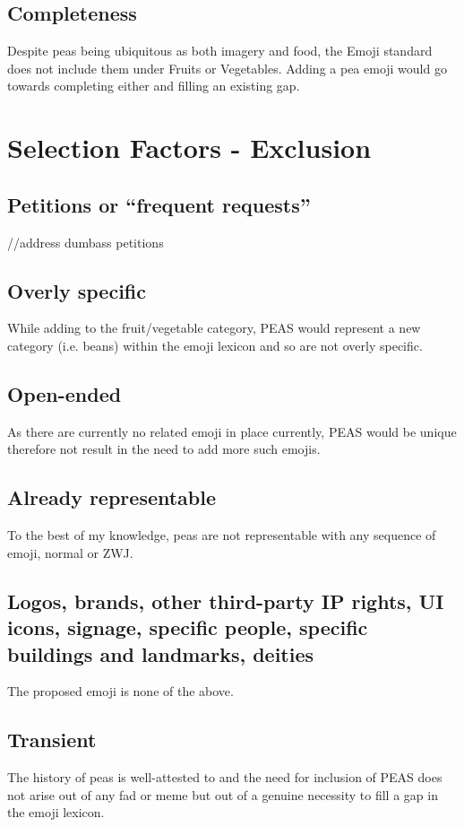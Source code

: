 \documentclass[oneside]{article}
\begin{document}
\subsection{Completeness}
Despite peas being ubiquitous as both imagery and food, the Emoji standard does
not include them under Fruits or Vegetables. Adding a pea emoji would go
towards completing either and filling an existing gap.

\section{Selection Factors - Exclusion}

\subsection{Petitions or “frequent requests”}
//address dumbass petitions

\subsection{Overly specific}
While adding to the fruit/vegetable category, PEAS would represent a new
category (i.e. beans) within the emoji lexicon and so are not overly specific.

\subsection{Open-ended}
As there are currently no related emoji in place currently, PEAS would be
unique therefore not result in the need to add more such emojis.

\subsection{Already representable}
To the best of my knowledge, peas are not representable with any sequence of
emoji, normal or ZWJ.

\subsection{Logos, brands, other third-party IP rights, UI icons, signage, specific people, specific buildings and landmarks, deities}
The proposed emoji is none of the above.

\subsection{Transient}
The history of peas is well-attested to and the need for inclusion of PEAS does
not arise out of any fad or meme but out of a genuine necessity to fill a gap
in the emoji lexicon.
\end{document}

